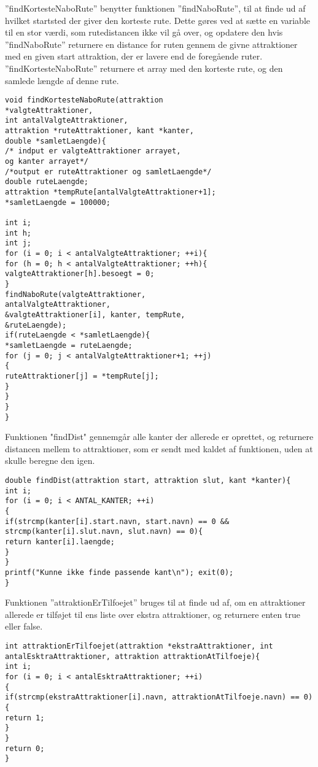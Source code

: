 ”findKortesteNaboRute” benytter funktionen ”findNaboRute”, til at finde ud af hvilket startsted der giver den korteste rute. Dette gøres ved at sætte en variable til en stor værdi, som rutedistancen ikke vil gå over, og opdatere den hvis ”findNaboRute” returnere en distance for ruten gennem de givne attraktioner med en given start attraktion, der er lavere end de foregående ruter. ”findKortesteNaboRute” returnere et array med den korteste rute, og den samlede længde af denne rute.  \newline

\begin{lstlisting}
void findKortesteNaboRute(attraktion
*valgteAttraktioner, 
int antalValgteAttraktioner, 
attraktion *ruteAttraktioner, kant *kanter, 
double *samletLaengde){
/* indput er valgteAttraktioner arrayet, 
og kanter arrayet*/
/*output er ruteAttraktioner og samletLaengde*/
double ruteLaengde;
attraktion *tempRute[antalValgteAttraktioner+1];
*samletLaengde = 100000;

int i;
int h;
int j;
for (i = 0; i < antalValgteAttraktioner; ++i){
for (h = 0; h < antalValgteAttraktioner; ++h){
valgteAttraktioner[h].besoegt = 0;
}
findNaboRute(valgteAttraktioner,
antalValgteAttraktioner, 
&valgteAttraktioner[i], kanter, tempRute,
&ruteLaengde);
if(ruteLaengde < *samletLaengde){
*samletLaengde = ruteLaengde;
for (j = 0; j < antalValgteAttraktioner+1; ++j)
{
ruteAttraktioner[j] = *tempRute[j];
}
}
}
}
\end{lstlisting}

Funktionen "findDist" gennemgår alle kanter der allerede er oprettet, og returnere distancen mellem to attraktioner, som er sendt med kaldet af funktionen, uden at skulle beregne den igen. \newline

\begin{lstlisting}
double findDist(attraktion start, attraktion slut, kant *kanter){
int i;
for (i = 0; i < ANTAL_KANTER; ++i)
{
if(strcmp(kanter[i].start.navn, start.navn) == 0 && strcmp(kanter[i].slut.navn, slut.navn) == 0){
return kanter[i].laengde;
}
}
printf("Kunne ikke finde passende kant\n"); exit(0);
}
\end{lstlisting}

Funktionen ”attraktionErTilfoejet” bruges til at finde ud af, om en attraktioner allerede er tilføjet til ens liste over ekstra attraktioner, og returnere enten true eller false. \newline

\begin{lstlisting}
int attraktionErTilfoejet(attraktion *ekstraAttraktioner, int antalEsktraAttraktioner, attraktion attraktionAtTilfoeje){
int i;
for (i = 0; i < antalEsktraAttraktioner; ++i)
{
if(strcmp(ekstraAttraktioner[i].navn, attraktionAtTilfoeje.navn) == 0){
return 1;
}
}
return 0;
}
\end{lstlisting}

